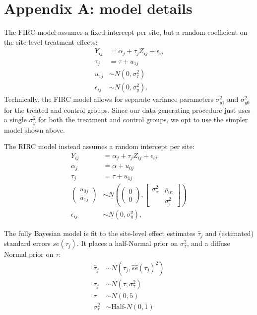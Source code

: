 \documentclass[]{article}
\begin{document}
\appendix
\section{Appendix A: model details}

The FIRC model assumes a fixed intercept per site, but a random coefficient on the site-level treatment effects:
\begin{align*}
	Y_{ij} &= \alpha_j + \tau_j Z_{ij} + \epsilon_{ij} \\
	\tau_j &= \tau + u_{1j} \\
	u_{1j} &\sim N(0, \sigma^2_\tau) \\
	\epsilon_{ij} &\sim N(0, \sigma^2_y).
\end{align*}
Technically, the FIRC model allows for separate variance parameters $\sigma^2_{y 1}$ and $\sigma^2_{y 0}$ for the treated and control groups.
Since our data-generating procedure just uses a single $\sigma^2_y$ for both the treatment and control groups, we opt to use the simpler model shown above.

The RIRC model instead assumes a random intercept per site:
\begin{align*}
	Y_{ij} &= \alpha_j + \tau_j Z_{ij} + \epsilon_{ij} \\
	\alpha_j &= \alpha + u_{0j} \\
	\tau_j &= \tau + u_{1j} \\
	\begin{pmatrix}
		u_{0j} \\ u_{1j}
	\end{pmatrix} &\sim N\left(
	\begin{pmatrix}
		0 \\ 0
	\end{pmatrix}, 
	\begin{bmatrix}
		\sigma^2_\alpha & \rho_{01} \\  & \sigma^2_\tau
	\end{bmatrix}\right) \\
	\epsilon_{ij} &\sim N(0, \sigma^2_y) ,
\end{align*}

The fully Bayesian model is fit to the site-level effect estimates $\hat{\tau}_j$ and (estimated) standard errors $se(\tau_j)$.
It places a half-Normal prior on $\sigma^2_\tau$, and a diffuse Normal prior on $\tau$:
\begin{align*}
	\hat{\tau}_j &\sim N(\tau_j, \hat{se}(\tau_j)^2) \\
	\tau_j &\sim N(\tau, \sigma^2_\tau) \\
	\tau &\sim N(0, 5) \\
	\sigma^2_\tau &\sim \text{Half-}N(0, 1)
\end{align*}


	
\end{document}
